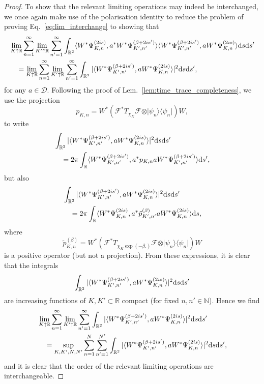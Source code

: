\documentclass[sn-mathphys-num]{sn-jnl}%
\newcommand{\RR}{\mathbb{R}}
\newcommand{\diff}{\textup{d}}
\numberwithin{equation}{section}
\theoremstyle{thmstyleone}%
\theoremstyle{thmstyletwo}%
\theoremstyle{thmstylethree}%
\begin{document}
\begin{proof}
To show that the relevant limiting operations may indeed be interchanged, we once again make use of the polarisation identity to reduce the problem of proving Eq.~\eqref{eq:lim_interchange} to showing that
\begin{align}
    &\lim_{K\uparrow\RR}\sum_{n=1}^\infty \lim_{K'\uparrow\RR}\sum_{n'=1}^\infty\int_{\RR^2} \langle W^*\Psi_{K,n}^{(2is)},a^*W^*\Psi_{K',n'}^{(\beta+2is')}\rangle\langle W^*\Psi_{K',n'}^{(\beta+2is')},aW^*\Psi_{K,n}^{(2is)}\rangle\diff s\diff s'\nonumber\\
    &\quad=\lim_{K\uparrow\RR}\sum_{n=1}^\infty \lim_{K'\uparrow\RR}\sum_{n'=1}^\infty\int_{\RR^2} \vert\langle W^*\Psi_{K',n'}^{(\beta+2is')},aW^*\Psi_{K,n}^{(2is)}\rangle\vert^2\diff s\diff s',
\end{align}
for any $a\in\mathcal{D}$.
Following the proof  of Lem.\ \ref{lem:time_trace_completeness}, we use the projection
 \begin{equation}
        p_{K,n}=W^*\left(\mathcal{F}^*T_{\chi_K}\mathcal{F}\otimes \vert\psi_n\rangle\langle\psi_n\vert\right)W,
\end{equation}
to write
\begin{align}
    &\int_{\RR^2} \vert\langle W^*\Psi_{K',n'}^{(\beta+2is')},aW^*\Psi_{K,n}^{(2is)}\rangle\vert^2\diff s\diff s'\nonumber\\
    &\quad=2\pi\int_{\RR} \langle W^*\Psi_{K',n'}^{(\beta+2is')},a^*p_{K,n}aW^*\Psi_{K',n'}^{(\beta+2is')}\rangle\diff s',
\end{align}
but also
\begin{align}
    &\int_{\RR^2} \vert\langle W^*\Psi_{K',n'}^{(\beta+2is')},aW^*\Psi_{K,n}^{(2is)}\rangle\vert^2\diff s\diff s'\nonumber\\
    &\quad=2\pi\int_{\RR} \langle W^*\Psi_{K,n}^{(2is)},a^*\tilde{p}^{(\beta)}_{K',n'}aW^*\Psi_{K,n}^{(2is)}\rangle\diff s,
\end{align}
 where 
\begin{equation}
        \tilde{p}^{(\beta)}_{K,n}=W^*\left(\mathcal{F}^*T_{\chi_K\exp(-\beta.)}\mathcal{F}\otimes \vert\psi_n\rangle\langle\psi_n\vert\right)W
\end{equation}
is a positive operator (but not a projection).
From these expressions, it is clear that the integrals 
\begin{equation}
    \int_{\RR^2} \vert\langle W^*\Psi_{K',n'}^{(\beta+2is')},aW^*\Psi_{K,n}^{(2is)}\rangle\vert^2\diff s\diff s'
\end{equation} are increasing functions of $K,K'\subset \RR$ compact (for fixed $n,n'\in\mathbb{N}$). Hence we find 
\begin{align}
    &\lim_{K\uparrow\RR}\sum_{n=1}^\infty \lim_{K'\uparrow\RR}\sum_{n'=1}^\infty\int_{\RR^2} \vert\langle W^*\Psi_{K',n'}^{(\beta+2is')},aW^*\Psi_{K,n}^{(2is)}\rangle\vert^2\diff s\diff s'\nonumber\\
    &\quad=\sup_{K,K',N,N'}\sum_{n=1}^N \sum_{n'=1}^{N'}\int_{\RR^2} \vert\langle W^*\Psi_{K',n'}^{(\beta+2is')},aW^*\Psi_{K,n}^{(2is)}\rangle\vert^2\diff s\diff s',
\end{align}
and it is clear that the order of the relevant limiting operations are interchangeable.
\end{proof}
\end{document}
